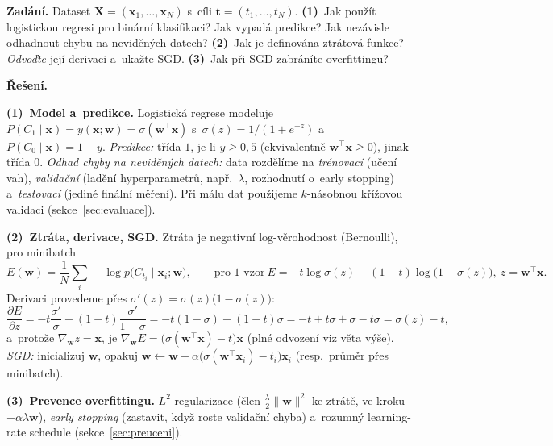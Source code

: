 \begin{priklad}
\par
\textbf{Zadání.} Dataset $\mathbf{X}=(\mathbf{x}_1,\dots,\mathbf{x}_N)$ s~cíli $\mathbf{t}=(t_1,\dots,t_N)$. \textbf{(1)}~Jak použít logistickou regresi pro binární klasifikaci? Jak vypadá predikce? Jak nezávisle odhadnout chybu na neviděných datech? \textbf{(2)}~Jak je definována ztrátová funkce? \emph{Odvoďte} její derivaci a~ukažte SGD. \textbf{(3)}~Jak při SGD zabráníte overfittingu?

\smallskip
\textbf{Řešení.}

\textbf{(1)~Model a~predikce.} Logistická regrese modeluje $P(C_1\mid\mathbf{x})=y(\mathbf{x};\mathbf{w})=\sigma(\mathbf{w}^{\!\top}\mathbf{x})$ s~$\sigma(z)=1/(1+e^{-z})$ a~$P(C_0\mid\mathbf{x})=1-y$. \emph{Predikce:} třída $1$, je-li $y\ge 0{,}5$ (ekvivalentně $\mathbf{w}^{\!\top}\mathbf{x}\ge 0$), jinak třída $0$. \emph{Odhad chyby na neviděných datech:} data rozdělíme na \emph{trénovací} (učení vah), \emph{validační} (ladění hyperparametrů, např.\ $\lambda$, rozhodnutí o~early stopping) a~\emph{testovací} (jediné finální měření). Při málu dat použijeme $k$-násobnou křížovou validaci (sekce~\ref{sec:evaluace}).

\textbf{(2)~Ztráta, derivace, SGD.} Ztráta je negativní log-věrohodnost (Bernoulli), pro minibatch
\[ E(\mathbf{w})=\frac1N\sum_i -\log p\big(C_{t_i}\mid\mathbf{x}_i;\mathbf{w}\big),\qquad
   \text{pro 1 vzor}\ E=-t\log\sigma(z)-(1-t)\log\big(1-\sigma(z)\big),\ z=\mathbf{w}^{\!\top}\mathbf{x}. \]
Derivaci provedeme přes $\sigma'(z)=\sigma(z)\big(1-\sigma(z)\big)$:
\[
\frac{\partial E}{\partial z}
= -t\frac{\sigma'}{\sigma}+(1-t)\frac{\sigma'}{1-\sigma}
= -t(1-\sigma)+(1-t)\sigma
= -t+t\sigma+\sigma-t\sigma
= \sigma(z)-t,
\]
a~protože $\nabla_{\mathbf{w}}z=\mathbf{x}$, je $\nabla_{\mathbf{w}}E=\big(\sigma(\mathbf{w}^{\!\top}\mathbf{x})-t\big)\mathbf{x}$ (plné odvození viz věta výše). \emph{SGD:} inicializuj $\mathbf{w}$, opakuj $\mathbf{w}\leftarrow\mathbf{w}-\alpha\big(\sigma(\mathbf{w}^{\!\top}\mathbf{x}_i)-t_i\big)\mathbf{x}_i$ (resp.\ průměr přes minibatch).

\textbf{(3)~Prevence overfittingu.} $L^2$ regularizace (člen $\tfrac{\lambda}{2}\|\mathbf{w}\|^2$ ke ztrátě, ve kroku $-\alpha\lambda\mathbf{w}$), \emph{early stopping} (zastavit, když roste validační chyba) a~rozumný learning-rate schedule (sekce~\ref{sec:preuceni}).
\end{priklad}

